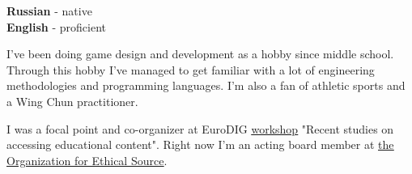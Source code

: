 \documentclass[8pt]{developercv} %
\begin{document}

\begin{minipage}[t]{0.3\textwidth}
	\vspace{-\baselineskip} %

	
	\textbf{Russian} - native\\
	\textbf{English} - proficient\\
\end{minipage}
\hfill
\begin{minipage}[t]{0.3\textwidth}
	\vspace{-\baselineskip} %
	
	
	{I've been doing game design and development as a hobby since middle school.} 
	{Through this hobby I've managed to get familiar with a lot of engineering methodologies and programming languages.}
	{I'm also a fan of athletic sports and a Wing Chun practitioner.}
\end{minipage}
\hfill
\begin{minipage}[t]{0.3\textwidth}
	\vspace{-\baselineskip} %
	
	
	{I was a focal point and co-organizer at EuroDIG \href{https://eurodigwiki.org/wiki/Recent_studies_on_accessing_educational_content_%E2%80%93_WS_11_2021}{\underline{workshop}} "Recent studies on accessing educational content".}
	{Right now I'm an acting board member at \underline{\href{https://ethicalsource.dev/governance/}{the Organization for Ethical Source}}.}
\end{minipage}

\end{document}
